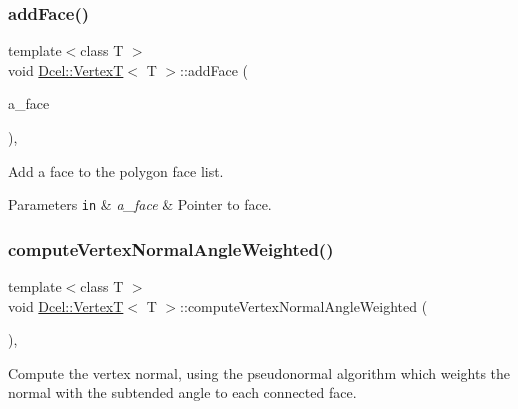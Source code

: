 \subsubsection{\texorpdfstring{add\+Face()}{addFace()}}
{\footnotesize\ttfamily template$<$class T $>$ \\
void \hyperlink{classDcel_1_1VertexT}{Dcel\+::\+VertexT}$<$ T $>$\+::add\+Face (\begin{DoxyParamCaption}\item[{const \hyperlink{classDcel_1_1VertexT_a5acb4c66c49319683c71f52e56ad8e8a}{Face\+Ptr} \&}]{a\+\_\+face }\end{DoxyParamCaption})\hspace{0.3cm}{\ttfamily [inline]}, {\ttfamily [noexcept]}}



Add a face to the polygon face list. 


\begin{DoxyParams}[1]{Parameters}
\mbox{\tt in}  & {\em a\+\_\+face} & Pointer to face. \\
\hline
\end{DoxyParams}
\mbox{\label{classDcel_1_1VertexT_aa9e66780ec134afe94d9e5a8221fdc0e}} 
\subsubsection{\texorpdfstring{compute\+Vertex\+Normal\+Angle\+Weighted()}{computeVertexNormalAngleWeighted()}\hspace{0.1cm}{\footnotesize\ttfamily [1/2]}}
{\footnotesize\ttfamily template$<$class T $>$ \\
void \hyperlink{classDcel_1_1VertexT}{Dcel\+::\+VertexT}$<$ T $>$\+::compute\+Vertex\+Normal\+Angle\+Weighted (\begin{DoxyParamCaption}{ }\end{DoxyParamCaption})\hspace{0.3cm}{\ttfamily [inline]}, {\ttfamily [noexcept]}}



Compute the vertex normal, using the pseudonormal algorithm which weights the normal with the subtended angle to each connected face. 

